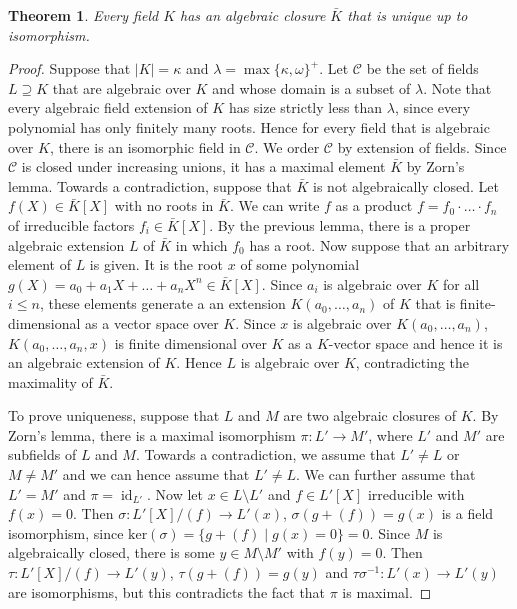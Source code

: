 \documentclass[10pt]{amsart}
\newcommand{\id}{\operatorname{id}}
\newcommand{\cC}{\mathcal{C}}
\newtheorem{theorem}{Theorem}[subsection]
\theoremstyle{definition}
\theoremstyle{remark}
\begin{document}
\begin{theorem} 
Every field $K$ has an algebraic closure $\bar{K}$ that is unique up to isomorphism. 
\end{theorem} 
\begin{proof} 
Suppose that $|K|=\kappa$ and $\lambda=\max\{\kappa,\omega\}^+$. Let $\cC$ be the set of fields $L\supseteq K$ that are algebraic over $K$ and whose domain is a subset of $\lambda$. Note that every algebraic field extension of $K$ has size strictly less than $\lambda$, since every polynomial has only finitely many roots. Hence for every field that is algebraic over $K$, there is an isomorphic field in $\cC$. We order $\cC$ by extension of fields. Since $\cC$ is closed under increasing unions, it has a maximal element $\bar{K}$ by Zorn's lemma. Towards a contradiction, suppose that $\bar{K}$ is not algebraically closed. Let $f(X)\in \bar{K}[X]$ with no roots in $\bar{K}$. We can write $f$ as a product $f=f_0\cdot \dots \cdot f_n$ of irreducible factors $f_i\in \bar{K}[X]$. By the previous lemma, there is a proper algebraic extension $L$ of $\bar{K}$ in which $f_0$ has a root. Now suppose that an arbitrary element of $L$ is given. It is the root $x$ of some polynomial $g(X)=a_0+a_1 X+\dots+a_n X^n\in \bar{K}[X]$. Since $a_i$ is algebraic over $K$ for all $i\leq n$, these elements generate a an extension $K(a_0,\dots,a_n)$ of $K$ that is finite-dimensional as a vector space over $K$. Since $x$ is algebraic over $K(a_0,\dots,a_n)$, $K(a_0,\dots,a_n,x)$ is finite dimensional over $K$ as a $K$-vector space and hence it is an algebraic extension of $K$. Hence $L$ is algebraic over $K$, contradicting the maximality of $\bar{K}$. 

To prove uniqueness, suppose that $L$ and $M$ are two algebraic closures of $K$. By Zorn's lemma, there is a maximal isomorphism $\pi\colon L'\rightarrow M'$, where $L'$ and $M'$ are subfields of $L$ and $M$. Towards a contradiction, we assume that $L'\neq L$ or $M\neq M'$ and we can hence assume that $L'\neq L$. We can further assume that $L'=M'$ and $\pi=\id_{L'}$. Now let $x\in L\setminus L'$ and $f\in L'[X]$ irreducible with $f(x)=0$. Then $\sigma\colon L'[X]/(f)\rightarrow L'(x)$, $\sigma(g+(f))=g(x)$ is a field isomorphism, since $\mathrm{ker}(\sigma)=\{g+(f)\mid g(x)=0\}=0$. Since $M$ is algebraically closed, there is some $y\in M\setminus M'$ with $f(y)=0$. Then $\tau\colon L'[X]/(f)\rightarrow L'(y)$, $\tau(g+(f))=g(y)$ and $\tau \sigma^{-1}\colon L'(x)\rightarrow L'(y)$ are isomorphisms, but this contradicts the fact that $\pi$ is maximal. 
\end{proof} 
\end{document}
